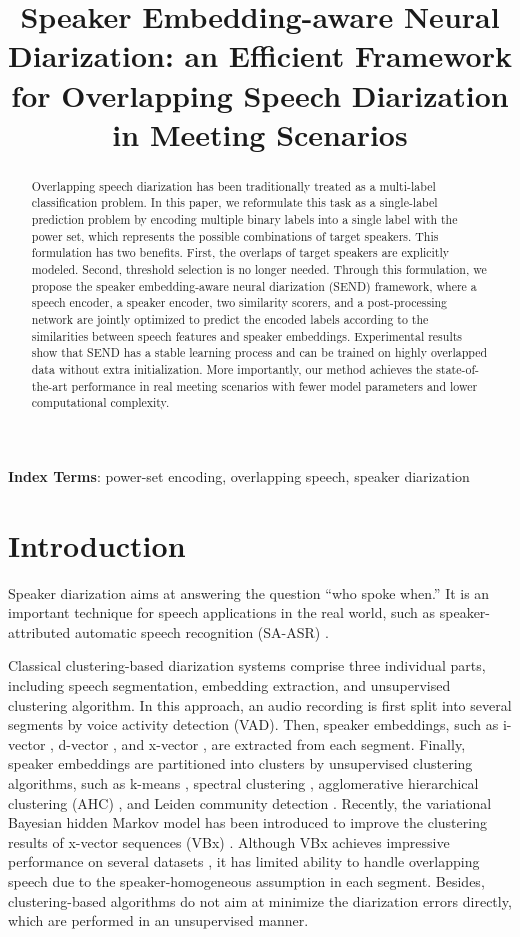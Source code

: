 \documentclass[a4paper]{article}
\title{Speaker Embedding-aware Neural Diarization: an Efficient Framework for Overlapping Speech Diarization in Meeting Scenarios}
\begin{document}
\maketitle
\begin{abstract}
Overlapping speech diarization has been traditionally treated as a multi-label classification problem.
  In this paper, we reformulate this task as a single-label prediction problem by encoding multiple binary labels into a single label with the power set, which represents the possible combinations of target speakers.
  This formulation has two benefits. First, the overlaps of target speakers are explicitly modeled. Second, threshold selection is no longer needed.
Through this formulation, we propose the speaker embedding-aware neural diarization (SEND) framework, where a speech encoder, a speaker encoder, two similarity scorers, and a post-processing network are jointly optimized to predict the encoded labels according to the similarities between speech features and speaker embeddings.
  Experimental results show that SEND has a stable learning process and can be trained on highly overlapped data without extra initialization.
  More importantly, our method achieves the state-of-the-art performance in real meeting scenarios with fewer model parameters and lower computational complexity.
\end{abstract}
\noindent\textbf{Index Terms}: power-set encoding, overlapping speech, speaker diarization

\section{Introduction}
\label{sec:intro}
Speaker diarization aims at answering the question ``who spoke when.''
It is an important technique for speech applications in the real world, such as speaker-attributed automatic speech recognition (SA-ASR) \cite{CarlettaABFGHKKKKLLLMPRW05,BarkerWVT18}.

Classical clustering-based diarization systems comprise three individual parts, including speech segmentation, embedding extraction, and unsupervised clustering algorithm.
In this approach, an audio recording is first split into several segments by voice activity detection (VAD). 
Then, speaker embeddings, such as i-vector \cite{DehakKDDO11}, d-vector \cite{WanWPL18}, and x-vector \cite{SnyderGSPK18}, are extracted from each segment.
Finally, speaker embeddings are partitioned into clusters by unsupervised clustering algorithms, such as k-means \cite{DimitriadisF17}, spectral clustering \cite{NingLTH06}, agglomerative hierarchical clustering (AHC) \cite{Garcia-RomeroSS17}, and Leiden community detection \cite{ZhengSQ2022}.
Recently, the variational Bayesian hidden Markov model has been introduced to improve the clustering results of x-vector sequences (VBx) \cite{DiezBWRC19}. Although VBx achieves impressive performance on several datasets \cite{CastaldoCDLV08, RyantCCCDGL19}, it has limited ability to handle overlapping speech due to the speaker-homogeneous assumption in each segment.
Besides, clustering-based algorithms do not aim at minimize the diarization errors directly, which are performed in an unsupervised manner.
\end{document}
